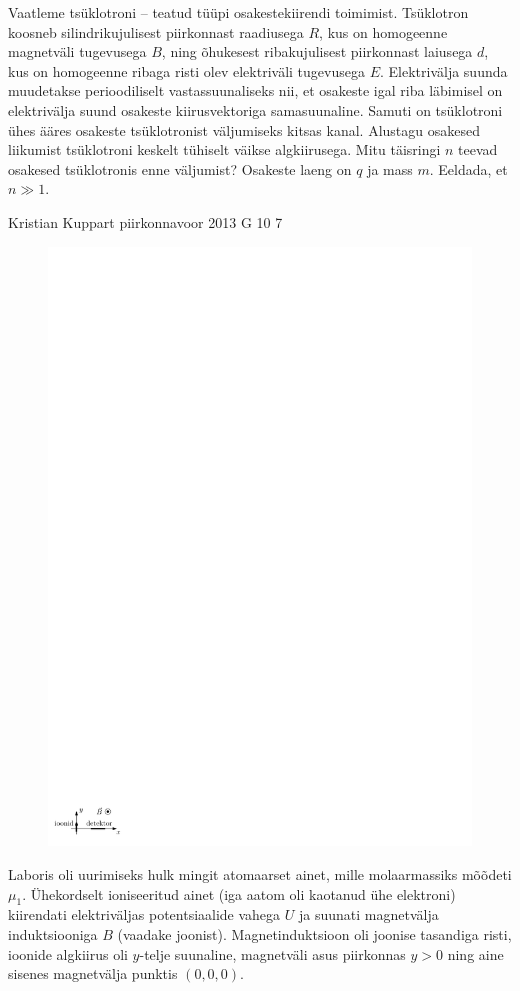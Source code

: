 \documentclass[11pt, twoside]{article}
\begin{document}
{{Vaatleme tsüklotroni -- teatud tüüpi osakestekiirendi toimimist. Tsüklotron koosneb silindrikujulisest piirkonnast raadiusega $R$, kus on homogeenne magnetväli tugevusega $B$, ning õhukesest ribakujulisest piirkonnast laiusega $d$, kus on homogeenne ribaga risti olev elektriväli tugevusega $E$. Elektrivälja suunda muudetakse perioodiliselt vastassuunaliseks nii, et osakeste igal riba läbimisel on elektrivälja suund osakeste kiirusvektoriga samasuunaline. Samuti on tsüklotroni ühes ääres osakeste tsüklotronist väljumiseks kitsas kanal. Alustagu osakesed liikumist tsüklotroni keskelt tühiselt väikse algkiirusega. Mitu täisringi $n$ teevad osakesed tsüklotronis enne väljumist? Osakeste laeng on $q$ ja mass $m$. Eeldada, et $n\gg 1.$
\fi
}

{Kristian Kuppart} %
{piirkonnavoor} %
{2013} %
{G 10} %
{7} %
{
\ifStatement
\begin{figure}%
\includegraphics[width=\linewidth]{2013-v2g-10-massspektromeeter_ipe}%
\end{figure}
Laboris oli uurimiseks hulk mingit atomaarset ainet, mille molaarmassiks mõõdeti
$\mu_{1}$. Ühekordselt ioniseeritud ainet (iga aatom oli kaotanud ühe
elektroni) kiirendati elektriväljas potentsiaalide vahega $U$ ja suunati magnetvälja
induktsiooniga $B$ (vaadake joonist). Magnetinduktsioon oli joonise tasandiga
risti, 
ioonide algkiirus oli $y$-telje suunaline,
magnetväli asus piirkonnas $y>0$ ning aine sisenes magnetvälja punktis
$(0, 0, 0)$.

}}
\end{document}
